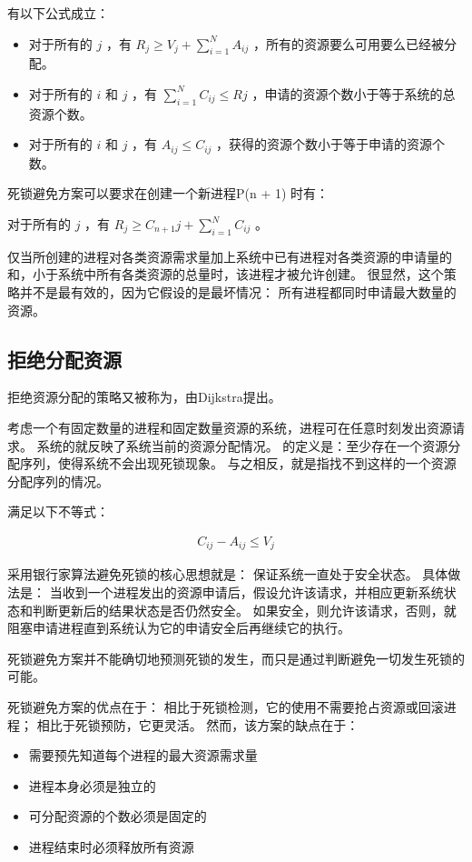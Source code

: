 {{        有以下公式成立：

        \begin{itemize}
            \item 对于所有的 $j$ ，有 $R_j \geq V_j + \sum_{i = 1}^N A_{ij}$ ，所有的资源要么可用要么已经被分配。
            \item 对于所有的 $i$ 和 $j$ ，有 $\sum_{i = 1}^N C_{ij} \leq R{j}$ ，申请的资源个数小于等于系统的总资源个数。
            \item 对于所有的 $i$ 和 $j$ ，有 $A_{ij} \leq C_{ij}$ ，获得的资源个数小于等于申请的资源个数。
        \end{itemize}

        死锁避免方案可以要求在创建一个新进程P(n + 1) 时有：

        对于所有的 $j$ ，有 $R_j \geq C_{n + 1}j + \sum_{i = 1}^N C_{ij}$ 。

        仅当所创建的进程对各类资源需求量加上系统中已有进程对各类资源的申请量的和，小于系统中所有各类资源的总量时，该进程才被允许创建。
        很显然，这个策略并不是最有效的，因为它假设的是最坏情况：
        所有进程都同时申请最大数量的资源。
    }

    \subsection{拒绝分配资源}
    {
        拒绝资源分配的策略又被称为，由Dijkstra提出。

        考虑一个有固定数量的进程和固定数量资源的系统，进程可在任意时刻发出资源请求。
        系统的就反映了系统当前的资源分配情况。
        的定义是：至少存在一个资源分配序列，使得系统不会出现死锁现象。
        与之相反，就是指找不到这样的一个资源分配序列的情况。

        满足以下不等式：

        \begin{align*}
            C_{ij} - A_{ij} \leq V_j
        \end{align*}

        采用银行家算法避免死锁的核心思想就是：
        保证系统一直处于安全状态。
        具体做法是：
        当收到一个进程发出的资源申请后，假设允许该请求，并相应更新系统状态和判断更新后的结果状态是否仍然安全。
        如果安全，则允许该请求，否则，就阻塞申请进程直到系统认为它的申请安全后再继续它的执行。

        死锁避免方案并不能确切地预测死锁的发生，而只是通过判断避免一切发生死锁的可能。

        死锁避免方案的优点在于：
        相比于死锁检测，它的使用不需要抢占资源或回滚进程；
        相比于死锁预防，它更灵活。
        然而，该方案的缺点在于：

        \begin{itemize}
            \item 需要预先知道每个进程的最大资源需求量
            \item 进程本身必须是独立的
            \item 可分配资源的个数必须是固定的
            \item 进程结束时必须释放所有资源
        \end{itemize}
    }
}

